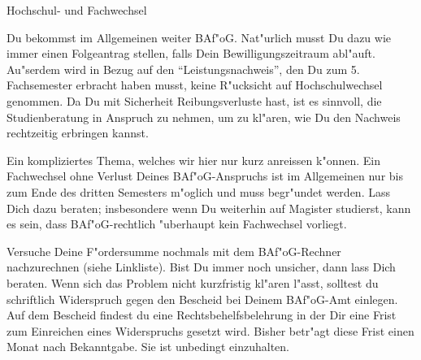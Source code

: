 \begin{artikel}{Hochschul- und Fachwechsel}
\vspace*{-1ex} 

Du bekommst im Allgemeinen weiter BAf"oG. Nat"urlich musst Du dazu wie immer einen Folgeantrag stellen, falls Dein Bewilligungszeitraum abl"auft. Au"serdem wird in Bezug auf den "`Leistungsnachweis"', den Du zum 5. Fachsemester erbracht haben musst, keine R"ucksicht auf Hochschulwechsel genommen. Da Du mit Sicherheit Reibungsverluste hast, ist es sinnvoll, die Studienberatung in Anspruch zu nehmen, um zu kl"aren, wie Du den Nachweis rechtzeitig erbringen kannst. 


Ein kompliziertes Thema, welches wir hier nur kurz anreissen k"onnen. Ein Fachwechsel ohne Verlust Deines BAf"oG-Anspruchs ist im Allgemeinen nur bis zum Ende des dritten Semesters m"oglich und muss begr"undet werden. Lass Dich dazu beraten; insbesondere wenn Du weiterhin auf Magister studierst, kann es sein, dass BAf"oG-rechtlich "uberhaupt kein Fachwechsel vorliegt.

Versuche Deine F"ordersumme nochmals mit dem BAf"oG-Rechner nachzurechnen (siehe Linkliste). Bist Du immer noch unsicher, dann lass Dich beraten. Wenn sich das Problem nicht kurzfristig kl"aren l"asst, solltest du schriftlich Widerspruch gegen den Bescheid bei Deinem BAf"oG-Amt einlegen. Auf dem Bescheid findest du eine Rechtsbehelfsbelehrung in der Dir eine Frist zum Einreichen eines Widerspruchs gesetzt wird. Bisher betr"agt diese Frist einen Monat nach Bekanntgabe. Sie ist unbedingt einzuhalten.
\end{artikel}
